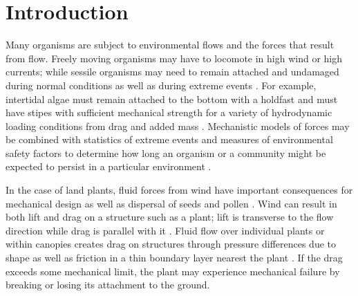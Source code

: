 \section{Introduction}
Many organisms are subject to environmental flows and the forces that result from flow. Freely moving organisms may have to locomote in high wind or high currents; while sessile organisms may need to remain attached and undamaged during normal conditions as well as during extreme events \citep{vogel1994life, vogel2003comparative}. For example, intertidal algae must remain attached to the bottom with a holdfast and must have stipes with sufficient mechanical strength for a variety of hydrodynamic loading conditions from drag and added mass \citep{carrington1992consequences, denny2002mechanics, stewart2004hydrodynamic, stewart2006hydrodynamic, boller2007interspecific}. Mechanistic models of forces may be combined with statistics of extreme events and measures of environmental safety factors to determine how long an organism or a community might be expected to persist in a particular environment \citep{denny2009on}. 

In the case of land plants, fluid forces from wind have important consequences for mechanical design \citep{delangre2008effects} as well as dispersal of seeds and pollen \citep{vogel2003comparative, evangelista2011explosive, stevenson2015when}. Wind can result in both lift and drag on a structure such as a plant; lift is transverse to the flow direction while drag is parallel with it \citep{vogel1994life, vogel2003comparative, kundu2012fluid}. Fluid flow over individual plants or within canopies creates drag on structures through pressure differences due to shape as well as friction in a thin boundary layer nearest the plant \citep{delangre2008effects, shapiro1961shape, kundu2012fluid, vogel1994life, vogel2003comparative}. If the drag exceeds some mechanical limit, the plant may experience mechanical failure by breaking or losing its attachment to the ground. 

